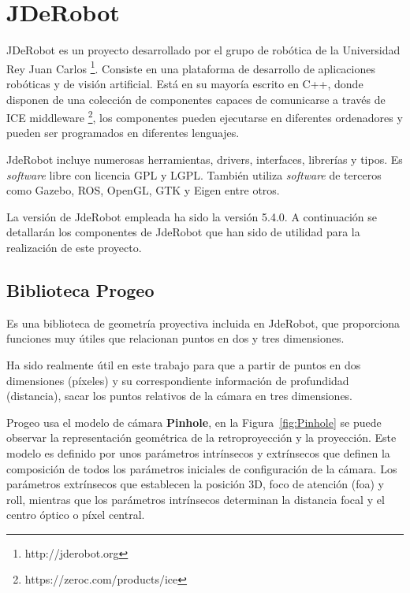 \section{JDeRobot}\label{jderobot}

JDeRobot es un proyecto desarrollado por el grupo de robótica de la Universidad Rey Juan Carlos \footnote{http://jderobot.org}. Consiste en una plataforma de desarrollo de aplicaciones robóticas y de visión artificial. Está en su mayoría escrito en C++, donde disponen de una colección de componentes capaces de comunicarse a través de ICE middleware \footnote{https://zeroc.com/products/ice}, los componentes pueden ejecutarse en diferentes ordenadores y pueden ser programados en diferentes lenguajes.

JdeRobot incluye numerosas herramientas, drivers, interfaces, librerías y tipos. Es \textit{software} libre con licencia GPL y LGPL. También utiliza \textit{software} de terceros como Gazebo, ROS, OpenGL, GTK y Eigen entre otros.

La versión de JdeRobot empleada ha sido la versión 5.4.0. A continuación se detallarán los componentes de JdeRobot que han sido de utilidad para la realización de este proyecto.

\subsection{Biblioteca Progeo}

Es una biblioteca de geometría proyectiva incluida en JdeRobot, que proporciona funciones muy útiles que relacionan puntos en dos y tres dimensiones.

Ha sido realmente útil en este trabajo para que a partir de puntos en dos dimensiones (píxeles) y su correspondiente información de profundidad (distancia), sacar los puntos relativos de la cámara en tres dimensiones.

Progeo usa el modelo de cámara \textbf{Pinhole}, en la Figura~\ref{fig:Pinhole} se puede observar la representación geométrica de la retroproyección y la proyección. Este modelo es definido por unos parámetros intrínsecos y extrínsecos que definen la composición de todos los parámetros iniciales de configuración de la cámara. Los parámetros extrínsecos que establecen la posición 3D, foco de atención (foa) y roll, mientras que los parámetros intrínsecos determinan la distancia focal y el centro óptico o píxel central.

